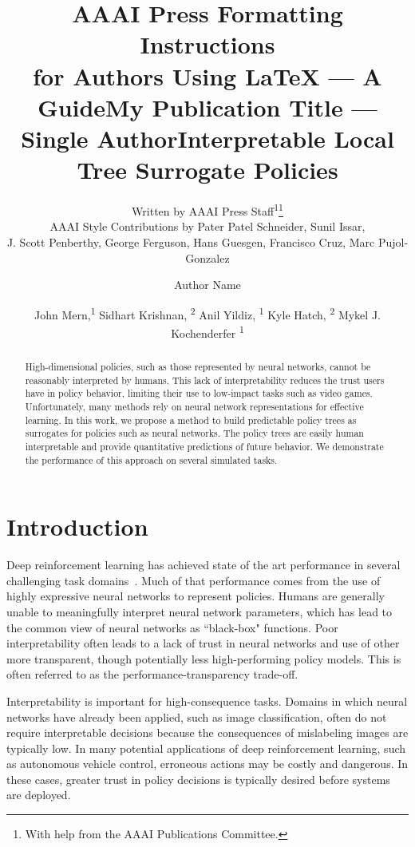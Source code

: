 \documentclass[letterpaper]{article} %
\title{AAAI Press Formatting Instructions \\for Authors Using \LaTeX{} --- A Guide}
\author{
    Written by AAAI Press Staff\textsuperscript{\rm 1}\thanks{With help from the AAAI Publications Committee.}\\
    AAAI Style Contributions by Pater Patel Schneider,
    Sunil Issar,\\
    J. Scott Penberthy,
    George Ferguson,
    Hans Guesgen,
    Francisco Cruz\equalcontrib,
    Marc Pujol-Gonzalez\equalcontrib
}
\title{My Publication Title --- Single Author}
\author {
    Author Name
}
\title{Interpretable Local Tree Surrogate Policies}
\author {
    John Mern,\textsuperscript{\rm 1}
    Sidhart Krishnan, \textsuperscript{\rm 2}
    Anil Yildiz, \textsuperscript{\rm 1}
    Kyle Hatch, \textsuperscript{\rm 2}
    Mykel J. Kochenderfer \textsuperscript{\rm 1}
}
\begin{document}
\maketitle
\begin{abstract}
High-dimensional policies, such as those represented by neural networks, cannot be reasonably interpreted by humans. 
This lack of interpretability reduces the trust users have in policy behavior, limiting their use to low-impact tasks such as video games.
Unfortunately, many methods rely on neural network representations for effective learning. 
In this work, we propose a method to build predictable policy trees as surrogates for policies such as neural networks.
The policy trees are easily human interpretable and provide quantitative predictions of future behavior. 
We demonstrate the performance of this approach on several simulated tasks. 
\end{abstract}
\section{Introduction}

Deep reinforcement learning has achieved state of the art performance in several challenging task domains~\cite{mnih2015}. 
Much of that performance comes from the use of highly expressive neural networks to represent policies.
Humans are generally unable to meaningfully interpret neural network parameters, which has lead to the common view of neural networks as ``black-box" functions. 
Poor interpretability often leads to a lack of trust in neural networks and use of other more transparent, though potentially less high-performing policy models. 
This is often referred to as the performance-transparency trade-off. %

Interpretability is important for high-consequence tasks.
Domains in which neural networks have already been applied, such as image classification, often do not require interpretable decisions because the consequences of mislabeling images are typically low. 
In many potential applications of deep reinforcement learning, such as autonomous vehicle control, erroneous actions may be costly and dangerous.
In these cases, greater trust in policy decisions is typically desired before systems are deployed.
\end{document}
